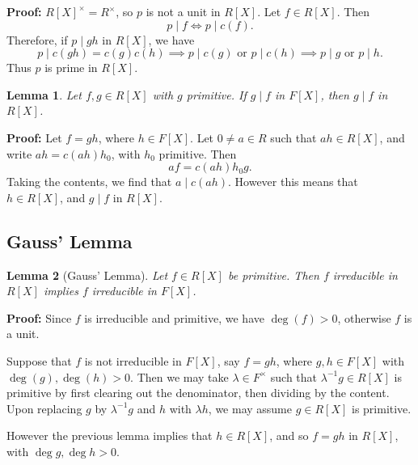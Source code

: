 \documentclass[12pt]{article}
\newtheorem{lemma}{Lemma}[section]
\theoremstyle{definition}
\theoremstyle{remark}
\begin{document}
\begin{adjustbox}{minipage = \columnwidth - 25.5pt, margin=1em, frame=1pt, margin=0em}
	\textbf{Proof:} $R[X]^{\times} = R^{\times}$, so $p$ is not a unit in $R[X]$. Let $f \in R[X]$. Then
	\[
		p \mid f \iff p \mid c(f)
	.\]
	Therefore, if $p \mid gh$ in $R[X]$, we have
	\[
		p \mid c(gh) = c(g)c(h) \implies p \mid c(g) \text{ or } p \mid c(h) \implies p \mid g \text{ or } p \mid h
	.\]
	Thus $p$ is prime in $R[X]$.
\end{adjustbox}

\begin{lemma}
	Let $f, g \in R[X]$ with $g$ primitive. If $g \mid f$ in $F[X]$, then $g \mid f$ in $R[X]$.
\end{lemma}

\begin{adjustbox}{minipage = \columnwidth - 25.5pt, margin=1em, frame=1pt, margin=0em}
	\textbf{Proof:} Let $f = gh$, where $h \in F[X]$. Let $0 \neq a \in R$ such that $ah \in R[X]$, and write $ah = c(ah)h_0$, with $h_0$ primitive. Then
	\[
		af = c(ah)h_0 g
	.\]
	Taking the contents, we find that $a \mid c(ah)$. However this means that $h \in R[X]$, and $g \mid f$ in $R[X]$.
\end{adjustbox}

\subsection{Gauss' Lemma}%
\label{sub:gauss_lemma}

\begin{lemma}[Gauss' Lemma]
	Let $f \in R[X]$ be primitive. Then $f$ irreducible in $R[X]$ implies $f$ irreducible in $F[X]$.
\end{lemma}

\begin{adjustbox}{minipage = \columnwidth - 25.5pt, margin=1em, frame=1pt, margin=0em}
	\textbf{Proof:} Since $f$ is irreducible and primitive, we have $\deg (f) > 0$, otherwise $f$ is a unit.

	Suppose that $f$ is not irreducible in $F[X]$, say $f = gh$, where $g, h \in F[X]$ with $\deg(g), \deg(h) > 0$. Then we may take $\lambda \in F^{\times}$ such that $\lambda^{-1} g \in R[X]$ is primitive by first clearing out the denominator, then dividing by the content. Upon replacing $g$ by $\lambda^{-1}g$ and $h$ with $\lambda h$, we may assume $g \in R[X]$ is primitive.

	However the previous lemma implies that $h \in R[X]$, and so $f = gh$ in $R[X]$, with $\deg g, \deg h > 0$.
\end{adjustbox}
\end{document}
